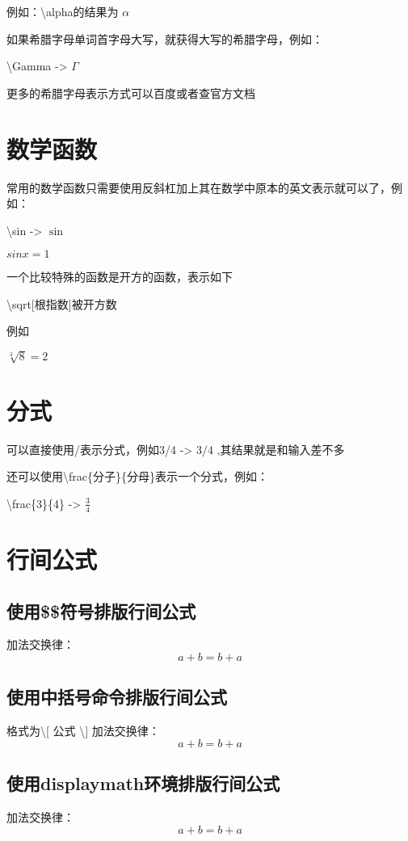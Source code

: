 \documentclass{ctexart}
\begin{document}
	例如：\textbackslash alpha的结果为 $ \alpha $
	
	如果希腊字母单词首字母大写，就获得大写的希腊字母，例如：
	
	\textbackslash Gamma -> $ \Gamma $
	
	更多的希腊字母表示方式可以百度或者查官方文档
	
	\section{数学函数}
	常用的数学函数只需要使用反斜杠加上其在数学中原本的英文表示就可以了，例如：
	
	\textbackslash sin -> $ \sin $
	
	$ sin x = 1 $
	
	一个比较特殊的函数是开方的函数，表示如下
	
	\textbackslash sqrt[根指数]{被开方数}
	
	例如
	
	$\sqrt[3]{8} = 2 $
	
	\section{分式}
	可以直接使用/表示分式，例如3/4 -> $ 3/4 $ ,其结果就是和输入差不多
	
	还可以使用\textbackslash frac\{分子\}\{分母\}表示一个分式，例如：
	
	\textbackslash frac\{3\}\{4\} -> $ \frac{3}{4} $
	
	\section{行间公式}
	
		\subsection{使用\$\$符号排版行间公式}
		加法交换律：
		$$ a + b = b + a $$
		
		\subsection{使用中括号命令排版行间公式}
		格式为\textbackslash [ 公式 \textbackslash ]
		加法交换律：
		\[ a + b = b + a \]
		
		\subsection{使用displaymath环境排版行间公式}
		加法交换律：
			\begin{displaymath}
				a + b = b + a
			\end{displaymath}
		
\end{document}
